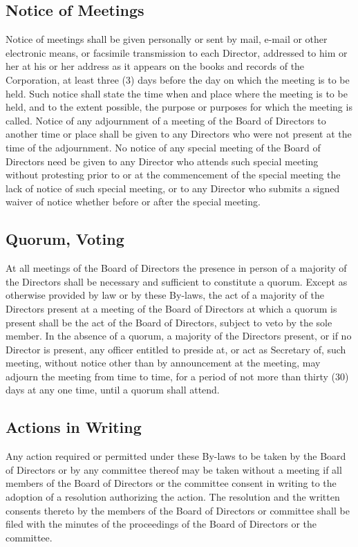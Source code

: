 \documentclass{article}
\begin{document}
\subsection{Notice of Meetings}
Notice of meetings shall be given personally or sent by mail, e-mail or other electronic means, or facsimile transmission to each Director, addressed to him or her at his or her address as it appears on the books and records of the Corporation, at least three (3) days before the day on which the meeting is to be held.  Such notice shall state the time when and place where the meeting is to be held, and to the extent possible, the purpose or purposes for which the meeting is called.  Notice of any adjournment of a meeting of the Board of Directors to another time or place shall be given to any Directors who were not present at the time of the adjournment.  No notice of any special meeting of the Board of Directors need be given to any Director who attends such special meeting without protesting prior to or at the commencement of the special meeting the lack of notice of such special meeting, or to any Director who submits a signed waiver of notice whether before or after the special meeting.
\subsection{Quorum, Voting}
At all meetings of the Board of Directors the presence in person of a majority of the Directors shall be necessary and sufficient to constitute a quorum.  Except as otherwise provided by law or by these By-laws, the act of a majority of the Directors present at a meeting of the Board of Directors at which a quorum is present shall be the act of the Board of Directors, subject to veto by the sole member.  In the absence of a quorum, a majority of the Directors present, or if no Director is present, any officer entitled to preside at, or act as Secretary of, such meeting, without notice other than by announcement at the meeting, may adjourn the meeting from time to time, for a period of not more than thirty (30) days at any one time, until a quorum shall attend.
\subsection{Actions in Writing}
 Any action required or permitted under these By-laws to be taken by the Board of Directors or by any committee thereof may be taken without a meeting if all members of the Board of Directors or the committee consent in writing to the adoption of a resolution authorizing the action.  The resolution and the written consents thereto by the members of the Board of Directors or committee shall be filed with the minutes of the proceedings of the Board of Directors or the committee.
\end{document}
